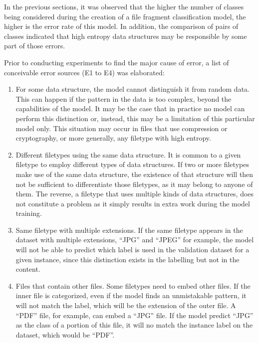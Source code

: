 \label{sec:exprandom}

In the previous sections, it was observed that the higher the number of classes being considered during the creation of a file fragment classification model, the higher is the error rate of this model. In addition, the comparison of pairs of classes indicated that high entropy data structures may be responsible by some part of those errors.

Prior to conducting experiments to find the major cause of error, a list of conceivable error sources (E1 to E4) was elaborated:
\begin{enumerate}[itemindent=\parindent,label=\textbf{E\arabic*.}]
    \item For some data structure, the model cannot distinguish it from random data. This can happen if the pattern in the data is too complex, beyond the capabilities of the model. It may be the case that in practice no model can perform this distinction or, instead, this may be a limitation of this particular model only. This situation may occur in files that use compression or cryptography, or more generally, any filetype with high entropy.

    \item Different filetypes using the same data structure. It is common to a given filetype to employ different types of data structures. If two or more filetypes make use of the same data structure, the existence of that structure will then not be sufficient to differentiate those filetypes, as it may belong to anyone of them.
    The reverse, a filetype that uses multiple kinds of data structures, does not constitute a problem as it simply results in extra work during the model training.

    \item Same filetype with multiple extensions. If the same filetype appears in the dataset with multiple extensions, ``JPG'' and ``JPEG'' for example, the model will not be able to predict which label is used in the validation dataset for a given instance, since this distinction exists in the labelling but not in the content.

    \item Files that contain other files. Some filetypes need to embed other files. If the inner file is categorized, even if the model finds an unmistakable pattern, it will not match the label, which will be the extension of the outer file. A ``PDF'' file, for example, can embed a ``JPG'' file. If the model predict ``JPG'' as the class of a portion of this file, it will no match the instance label on the dataset, which would be ``PDF''.
\end{enumerate}

